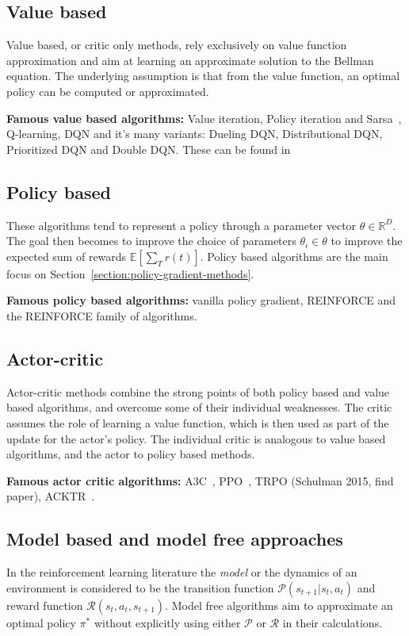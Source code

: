 \documentclass{../main.tex}{}
\begin{document}
\subsection{Value based}
Value based, or critic only methods, rely exclusively on value function approximation and aim at learning an approximate solution to the Bellman equation. The underlying assumption is that from the value function, an optimal policy can be computed or approximated.

\textbf{Famous value based algorithms:} Value iteration, Policy iteration and Sarsa~\cite{Sutton1998}, Q-learning, DQN and it's many variants: Dueling DQN, Distributional DQN, Prioritized DQN and Double DQN\@. These can be found in~\citep{Hessel2017}

\subsection{Policy based}
These algorithms tend to represent a policy through a parameter vector $\theta
\in \mathbb{R}^D$. The goal then becomes to improve the choice of parameters
$\theta_i \in \theta$ to improve the expected sum of rewards
$\mathbb{E}[\sum_{T} r(t)]$. Policy based algorithms are the main focus on Section~\ref{section:policy-gradient-methods}.

\textbf{Famous policy based algorithms:} vanilla policy gradient, REINFORCE\citep{Williams1992} and the REINFORCE family of algorithms\@.

\subsection{Actor-critic}

Actor-critic methods combine the strong points of both policy based and value based algorithms, and overcome some of their individual weaknesses. The critic assumes the role of learning a value function, which is then used as part of the update for the actor's policy. The individual critic is analogous to value based algorithms, and the actor to policy based methods.

\textbf{Famous actor critic algorithms:} A3C~\citep{Mnih2016}, PPO~\citep{Schulman2017}, TRPO (Schulman 2015, find paper), ACKTR~\citep{Wu2017}.

\subsection{Model based and model free approaches}
In the reinforcement learning literature the \textit{model} or the dynamics of an environment is considered to be the transition function $\mathcal{P}(s_{t+1} | s_t, a_t)$ and reward function $\mathcal{R}(s_t, a_t, s_{t+1})$. Model free algorithms aim to approximate an optimal policy $\pi^*$ without explicitly using either $\mathcal{P}$ or $\mathcal{R}$ in their calculations.
\end{document}
